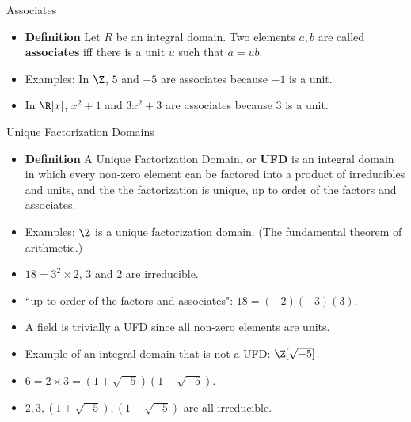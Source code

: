 \documentclass[handout]{beamer}
\begin{document}

\begin{frame}{Associates}

\begin{itemize}
  \item \textbf{Definition} Let $R$ be an integral domain. Two elements $a,b$ are called \textbf{associates} iff there is a unit $u$ such that $a=ub$.
  \item Examples: In $\Z$, $5$ and $-5$ are associates because $-1$ is a unit.
  \item In $\R[x]$, $x^2+1$ and $3x^2 +3$ are associates because $3$ is a unit.
\end{itemize}

\end{frame}


\begin{frame}{Unique Factorization Domains}

\begin{itemize}
  \item \textbf{Definition} A Unique Factorization Domain, or \textbf{UFD} is an integral domain in which every non-zero element can be factored into a product of irreducibles and units, and the the factorization is unique, up to order of the factors and associates.
  \item Examples: $\Z$ is a unique factorization domain. (The fundamental theorem of arithmetic.)
  \item $18 = 3^2 \times 2$, $3$ and $2$ are irreducible.
  \item ``up to order of the factors and associates": $18 = (-2)(-3) (3)$.
  \item A field is trivially a UFD since all non-zero elements are units.
  \item Example of an integral domain that is not a UFD: $\Z[\sqrt{-5}]$.
  \item $6 = 2\times 3 = (1+\sqrt{-5})(1-\sqrt{-5})$.
  \item $2,3,(1+\sqrt{-5}),(1-\sqrt{-5})$ are all irreducible.
\end{itemize}

\end{frame}

\end{document}
